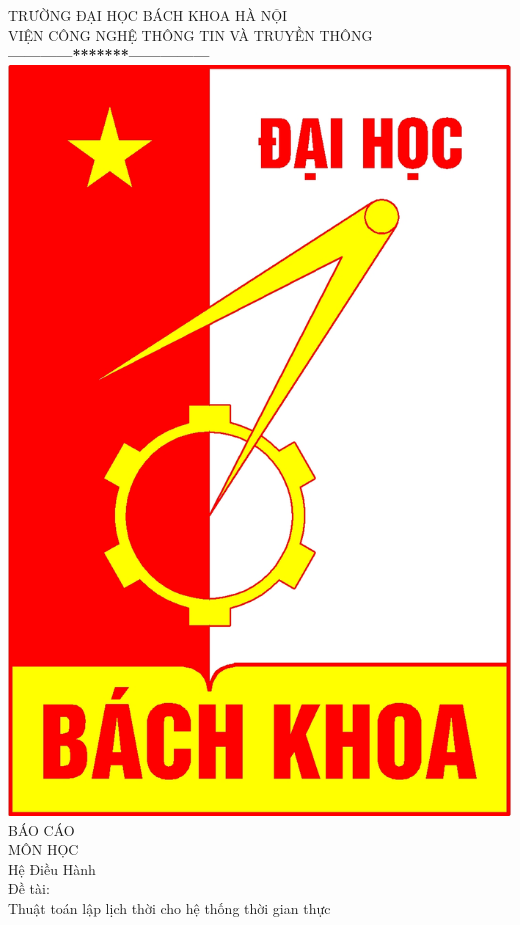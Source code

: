 \documentclass[a4paper,10pt]{report}
\begin{document}
\thispagestyle{empty}
\thisfancypage{
\setlength{\fboxrule}{1pt}
\doublebox}{}
\begin{center}
{\fontsize{16}{19}\selectfont TRƯỜNG ĐẠI HỌC BÁCH KHOA HÀ NỘI\\
VIỆN CÔNG NGHỆ THÔNG TIN VÀ TRUYỀN THÔNG}\\
\textbf{------------*******---------------}\\[1cm]
\includegraphics[scale=0.13]{hust.jpg}\\[1.3cm]

{\fontsize{32}{43}\selectfont BÁO CÁO}\\[0.1cm]
{\fontsize{38}{45}\selectfont MÔN HỌC}\\[0.2cm]
{\fontsize{19}{20}\selectfont Hệ Điều Hành}\\[1cm]
{\fontsize{17}{24}\selectfont Đề tài:}\\[1cm]
{\fontsize{17}{24}\selectfont Thuật toán lập lịch thời cho hệ thống thời gian thực}\\[2cm]
\end{center}
\end{document}
